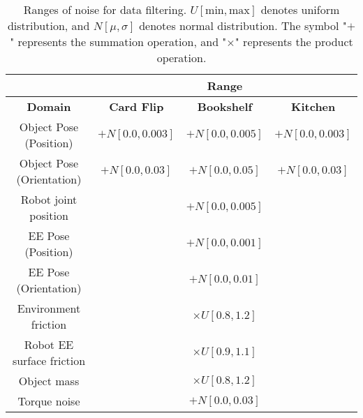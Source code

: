 \begin{table}[H]
\begin{adjustbox}{width=\columnwidth} %

\centering
\begin{tabular}{|c|c|c|c|}
\hline
\textbf{}                   & \multicolumn{3}{c|}{\textbf{Range}}           \\ \hline
\textbf{Domain}                   & \textbf{Card Flip}     & \textbf{Bookshelf}     & \textbf{Kitchen}           \\ \hline
Object Pose (Position)              & $+ N[0.0, 0.003]$      & $+ N[0.0, 0.005]$ & $+ N[0.0, 0.003]$ \\ \hline
Object Pose (Orientation)           & $+ N[0.0, 0.03]$       & $+ N[0.0, 0.05]$ & $+ N[0.0, 0.03]$ \\ \hline
Robot joint position                & \multicolumn{3}{c|}{$+ N[0.0, 0.005]$}   \\ \hline
EE Pose (Position)                  & \multicolumn{3}{c|}{$+ N[0.0, 0.001]$}   \\ \hline
EE Pose (Orientation)               & \multicolumn{3}{c|}{$+ N[0.0, 0.01]$}    \\ \hline
Environment friction                & \multicolumn{3}{c|}{$\times U[0.8, 1.2]$}\\ \hline
Robot EE surface friction           & \multicolumn{3}{c|}{$\times U[0.9, 1.1]$}\\ \hline
Object mass                         & \multicolumn{3}{c|}{$\times U[0.8, 1.2]$}\\ \hline
Torque noise                        & \multicolumn{3}{c|}{$+ N[0.0, 0.03]$}    \\ \hline
\end{tabular}
\end{adjustbox}
\caption{Ranges of noise for data filtering. \( U[\text{min}, \text{max}] \) denotes uniform distribution, and \( N[\mu, \sigma] \) denotes normal distribution. The symbol "$+$" represents the summation operation, and "$\times$" represents the product operation.}\label{table:DR_params}
\end{table}
